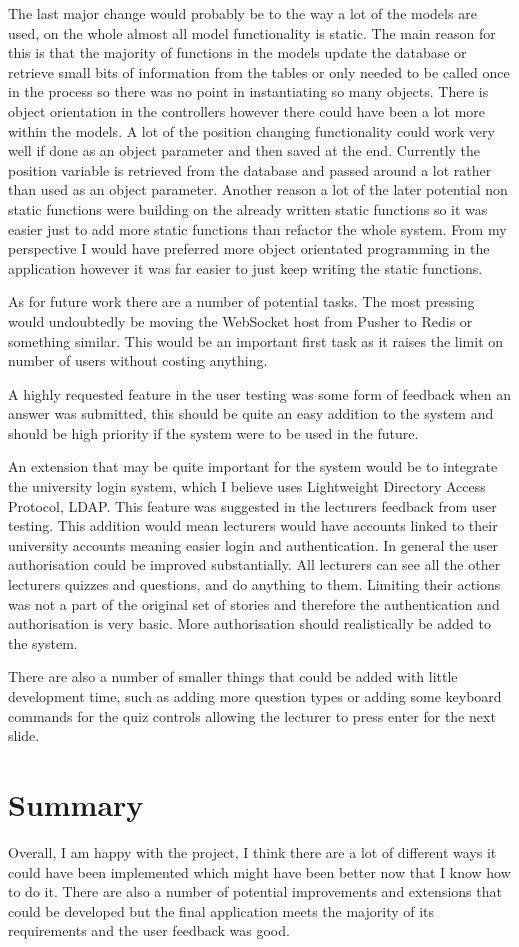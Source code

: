 The last major change would probably be to the way a lot of the models are used, on the whole almost all model functionality is static. The main reason for this is that the majority of functions in the models update the database or retrieve small bits of information from the tables or only needed to be called once in the process so there was no point in instantiating so many objects. There is object orientation in the controllers however there could have been a lot more within the models. A lot of the position changing functionality could work very well if done as an object parameter and then saved at the end. Currently the position variable is retrieved from the database and passed around a lot rather than used as an object parameter. Another reason a lot of the later potential non static functions were building on the already written static functions so it was easier just to add more static functions than refactor the whole system. From my perspective I would have preferred more object orientated programming in the application however it was far easier to just keep writing the static functions.

As for future work there are a number of potential tasks. The most pressing would undoubtedly be moving the WebSocket host from Pusher to Redis or something similar. This would be an important first task as it raises the limit on number of users without costing anything. 

A highly requested feature in the user testing was some form of feedback when an answer was submitted, this should be quite an easy addition to the system and should be high priority if the system were to be used in the future.

An extension that may be quite important for the system would be to integrate the university login system, which I believe uses Lightweight Directory Access Protocol, LDAP. This feature was suggested in the lecturers feedback from user testing. This addition would mean lecturers would have accounts linked to their university accounts meaning easier login and authentication. In general the user authorisation could be improved substantially. All lecturers can see all the other lecturers quizzes and questions, and do anything to them. Limiting their actions was not a part of the original set of stories and therefore the authentication and authorisation is very basic. More authorisation should realistically be added to the system.

There are also a number of smaller things that could be added with little development time, such as adding more question types or adding some keyboard commands for the quiz controls allowing the lecturer to press enter for the next slide.

\section{Summary}
Overall, I am happy with the project, I think there are a lot of different ways it could have been implemented which might have been better now that I know how to do it. There are also a number of potential improvements and extensions that could be developed but the final application meets the majority of its requirements and the user feedback was good.